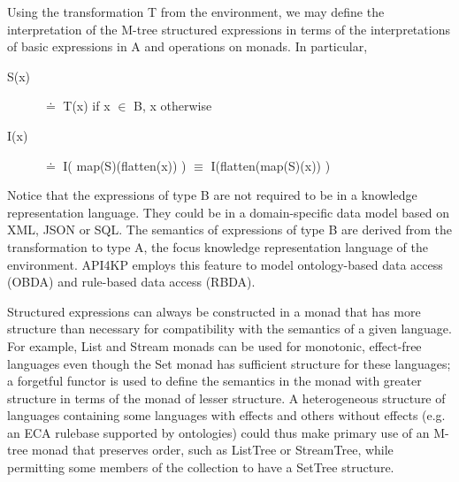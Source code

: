 \documentclass[runningheads]{llncs}
\begin{document}
Using the transformation T from the environment, we may define the interpretation of the M-tree structured expressions in terms of the interpretations of basic expressions in A and operations on monads. In particular,
\begin{description}
\item[S(x)] $\doteq$ T(x) if x $\in$ B, x otherwise
\item[I(x)] $\doteq$ I( map(S)(flatten(x)) ) $\equiv$ I(flatten(map(S)(x)) )
\end{description}
Notice that the expressions of type B are not required to be in a knowledge representation language. They could be in a domain-specific data model based on XML, JSON or SQL. The semantics of expressions of type B are derived from the transformation to type A, the focus  knowledge representation language of the environment. API4KP employs this feature to model ontology-based data access (OBDA) and rule-based data access (RBDA).

Structured expressions can always be constructed in a monad that has more structure than necessary for compatibility with the semantics of a given language.
For example, List and Stream monads can be used for monotonic, effect-free languages even though the Set monad has sufficient structure for these languages;
a forgetful functor is used to define the semantics in the monad with greater structure in terms of the monad of lesser structure.
A heterogeneous structure of languages containing some languages with effects and others without effects (e.g. an ECA rulebase supported by ontologies) could thus make primary use of an M-tree monad that preserves order, such as ListTree or StreamTree, while permitting some members of the collection to have a SetTree structure. 
\end{document}
